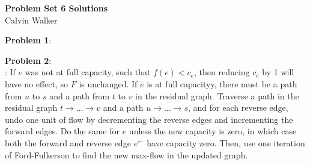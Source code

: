 \documentclass{article}
\begin{document}
\begin{center}
    \Large{\textbf{Problem Set 6 Solutions}} \\[0.25ex]
    Calvin Walker
\end{center}
\textbf{Problem 1}:

\begin{center}

\end{center}
\textbf{Problem 2}: \\[1.0ex]
: If $e$ was not at full capacity, such that $f(e) < c_e$, then reducing $c_e$ by 1 will have no effect, so $F$ is unchanged. If $e$ is at full capacityy, there must be a path from $u$ to $s$ and a path from $t$ to $v$ in the residual graph. Traverse a path in the residual graph $t \rightarrow \dots \rightarrow v$ and a path $u \rightarrow \dots \rightarrow s$, and for each reverse edge, undo one unit of flow by decrementing the reverse edges and incrementing the forward edges. Do the same for $e$ unless the new capacity is zero, in which case both the forward and reverse edge $e^{\leftarrow}$ have capacity zero. Then, use one iteration of Ford-Fulkerson to find the new max-flow in the updated graph. \\[0.5ex]
\end{document}
